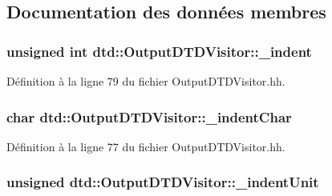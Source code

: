 \subsection{Documentation des données membres}
\hypertarget{classdtd_1_1_output_d_t_d_visitor_a8659c38013b7a5ba99e78c295a224362}{
\subsubsection[{\_\-indent}]{\setlength{\rightskip}{0pt plus 5cm}unsigned int {\bf dtd::OutputDTDVisitor::\_\-indent}}}
\label{classdtd_1_1_output_d_t_d_visitor_a8659c38013b7a5ba99e78c295a224362}


Définition à la ligne 79 du fichier OutputDTDVisitor.hh.

\hypertarget{classdtd_1_1_output_d_t_d_visitor_ae58e26bcaaa7c8681209a13934cea5f7}{
\subsubsection[{\_\-indentChar}]{\setlength{\rightskip}{0pt plus 5cm}char {\bf dtd::OutputDTDVisitor::\_\-indentChar}}}
\label{classdtd_1_1_output_d_t_d_visitor_ae58e26bcaaa7c8681209a13934cea5f7}


Définition à la ligne 77 du fichier OutputDTDVisitor.hh.

\hypertarget{classdtd_1_1_output_d_t_d_visitor_a913f11153a7fe38b61ff090d5bd99c89}{
\subsubsection[{\_\-indentUnit}]{\setlength{\rightskip}{0pt plus 5cm}unsigned {\bf dtd::OutputDTDVisitor::\_\-indentUnit}}}
\label{classdtd_1_1_output_d_t_d_visitor_a913f11153a7fe38b61ff090d5bd99c89}


